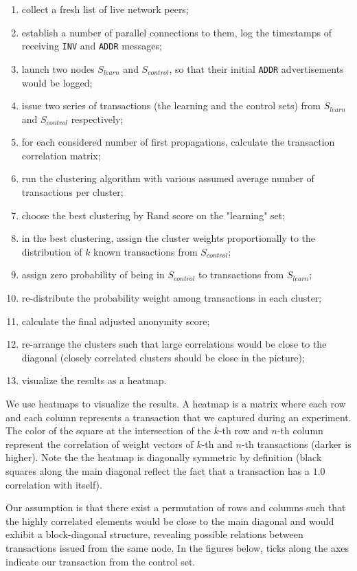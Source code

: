 \begin{enumerate}
	\item collect a fresh list of live network peers;
	\item establish a number of parallel connections to them, log the timestamps of receiving \texttt{INV} and \texttt{ADDR} messages;
	\item launch two nodes $S_{learn}$ and $S_{control}$, so that their initial \texttt{ADDR} advertisements would be logged;
	\item issue two series of transactions (the learning and the control sets) from $S_{learn}$ and $S_{control}$ respectively;
	\item for each considered number of first propagations, calculate the transaction correlation matrix;
	\item run the clustering algorithm with various assumed average number of transactions per cluster;
	\item choose the best clustering by Rand score on the "learning" set;
	\item in the best clustering, assign the cluster weights proportionally to the distribution of $k$ known transactions from $S_{control}$;
	\item assign zero probability of being in $S_{control}$ to transactions from $S_{learn}$;
	\item re-distribute the probability weight among transactions in each cluster;
	\item calculate the final adjusted anonymity score;
	\item re-arrange the clusters such that large correlations would be close to the diagonal (closely correlated clusters should be close in the picture);
	\item visualize the results as a heatmap.
\end{enumerate}

We use heatmaps to visualize the results.
A heatmap is a matrix where each row and each column represents a transaction that we captured during an experiment.
The color of the square at the intersection of the $k$-th row and $n$-th column represent the correlation of weight vectors of $k$-th and $n$-th transactions (darker is higher).
Note the the heatmap is diagonally symmetric by definition (black squares along the  main diagonal reflect the fact that a transaction has a $1.0$ correlation with itself).

Our assumption is that there exist a permutation of rows and columns such that the highly correlated elements would be close to the main diagonal and would exhibit a block-diagonal structure, revealing possible relations between transactions issued from the same node.
In the figures below, ticks along the axes indicate our transaction from the control set.


